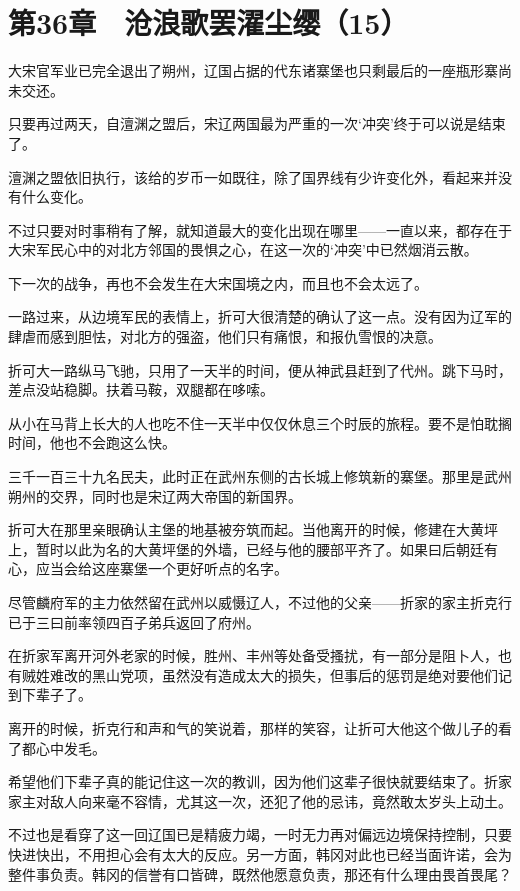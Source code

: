 \section{第36章　沧浪歌罢濯尘缨（15）}

大宋官军业已完全退出了朔州，辽国占据的代东诸寨堡也只剩最后的一座瓶形寨尚未交还。

只要再过两天，自澶渊之盟后，宋辽两国最为严重的一次‘冲突’终于可以说是结束了。

澶渊之盟依旧执行，该给的岁币一如既往，除了国界线有少许变化外，看起来并没有什么变化。

不过只要对时事稍有了解，就知道最大的变化出现在哪里——一直以来，都存在于大宋军民心中的对北方邻国的畏惧之心，在这一次的‘冲突’中已然烟消云散。

下一次的战争，再也不会发生在大宋国境之内，而且也不会太远了。

一路过来，从边境军民的表情上，折可大很清楚的确认了这一点。没有因为辽军的肆虐而感到胆怯，对北方的强盗，他们只有痛恨，和报仇雪恨的决意。

折可大一路纵马飞驰，只用了一天半的时间，便从神武县赶到了代州。跳下马时，差点没站稳脚。扶着马鞍，双腿都在哆嗦。

从小在马背上长大的人也吃不住一天半中仅仅休息三个时辰的旅程。要不是怕耽搁时间，他也不会跑这么快。

三千一百三十九名民夫，此时正在武州东侧的古长城上修筑新的寨堡。那里是武州朔州的交界，同时也是宋辽两大帝国的新国界。

折可大在那里亲眼确认主堡的地基被夯筑而起。当他离开的时候，修建在大黄坪上，暂时以此为名的大黄坪堡的外墙，已经与他的腰部平齐了。如果曰后朝廷有心，应当会给这座寨堡一个更好听点的名字。

尽管麟府军的主力依然留在武州以威慑辽人，不过他的父亲——折家的家主折克行已于三曰前率领四百子弟兵返回了府州。

在折家军离开河外老家的时候，胜州、丰州等处备受搔扰，有一部分是阻卜人，也有贼姓难改的黑山党项，虽然没有造成太大的损失，但事后的惩罚是绝对要他们记到下辈子了。

离开的时候，折克行和声和气的笑说着，那样的笑容，让折可大他这个做儿子的看了都心中发毛。

希望他们下辈子真的能记住这一次的教训，因为他们这辈子很快就要结束了。折家家主对敌人向来毫不容情，尤其这一次，还犯了他的忌讳，竟然敢太岁头上动土。

不过也是看穿了这一回辽国已是精疲力竭，一时无力再对偏远边境保持控制，只要快进快出，不用担心会有太大的反应。另一方面，韩冈对此也已经当面许诺，会为整件事负责。韩冈的信誉有口皆碑，既然他愿意负责，那还有什么理由畏首畏尾？

